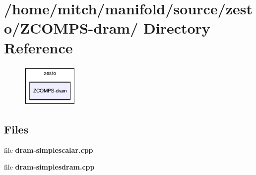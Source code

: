 \section{/home/mitch/manifold/source/zesto/ZCOMPS-dram/ Directory Reference}
\label{dir_818e3a37e58460011f98c43952957263}


\nopagebreak
\begin{figure}[H]
\begin{center}
\leavevmode
\includegraphics[width=79pt]{dir_818e3a37e58460011f98c43952957263_dep}
\end{center}
\end{figure}
\subsection*{Files}
\begin{CompactItemize}
\item 
file {\bf dram-simplescalar.cpp}
\item 
file {\bf dram-simplesdram.cpp}
\end{CompactItemize}

